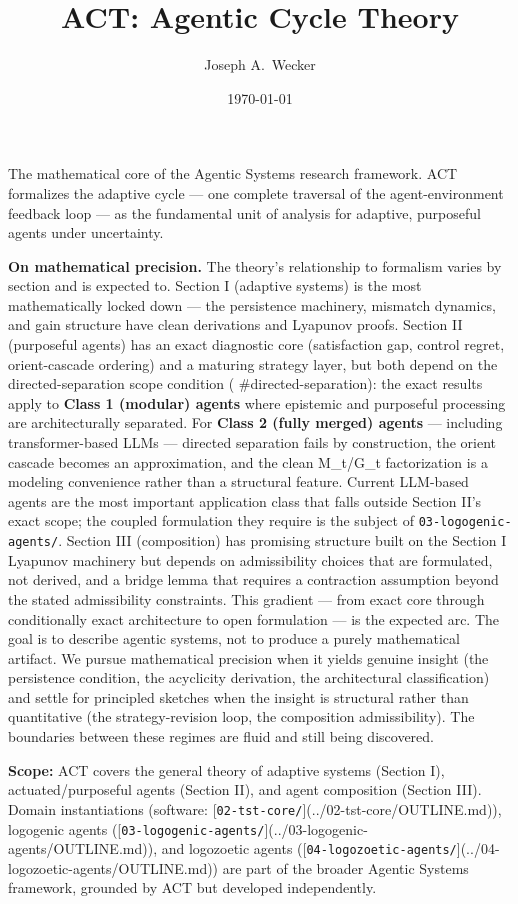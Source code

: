 \documentclass[11pt,oneside]{article}
\title{ACT: Agentic Cycle Theory}
\author{Joseph A.\ Wecker}
\date{\today}
\begin{document}
\maketitle
\tableofcontents
\newpage

The mathematical core of the Agentic Systems research framework. ACT formalizes the adaptive cycle — one complete traversal of the agent-environment feedback loop — as the fundamental unit of analysis for adaptive, purposeful agents under uncertainty.

\textbf{On mathematical precision.} The theory's relationship to formalism varies by section and is expected to. Section I (adaptive systems) is the most mathematically locked down — the persistence machinery, mismatch dynamics, and gain structure have clean derivations and Lyapunov proofs. Section II (purposeful agents) has an exact diagnostic core (satisfaction gap, control regret, orient-cascade ordering) and a maturing strategy layer, but both depend on the directed-separation scope condition ( \#directed-separation): the exact results apply to \textbf{Class 1 (modular) agents} where epistemic and purposeful processing are architecturally separated. For \textbf{Class 2 (fully merged) agents} — including transformer-based LLMs — directed separation fails by construction, the orient cascade becomes an approximation, and the clean M\_t/G\_t factorization is a modeling convenience rather than a structural feature. Current LLM-based agents are the most important application class that falls outside Section II's exact scope; the coupled formulation they require is the subject of \texttt{03-logogenic-agents/}. Section III (composition) has promising structure built on the Section I Lyapunov machinery but depends on admissibility choices that are formulated, not derived, and a bridge lemma that requires a contraction assumption beyond the stated admissibility constraints. This gradient — from exact core through conditionally exact architecture to open formulation — is the expected arc. The goal is to describe agentic systems, not to produce a purely mathematical artifact. We pursue mathematical precision when it yields genuine insight (the persistence condition, the acyclicity derivation, the architectural classification) and settle for principled sketches when the insight is structural rather than quantitative (the strategy-revision loop, the composition admissibility). The boundaries between these regimes are fluid and still being discovered.

\textbf{Scope:} ACT covers the general theory of adaptive systems (Section I), actuated/purposeful agents (Section II), and agent composition (Section III). Domain instantiations (software: [\texttt{02-tst-core/}](../02-tst-core/OUTLINE.md)), logogenic agents ([\texttt{03-logogenic-agents/}](../03-logogenic-agents/OUTLINE.md)), and logozoetic agents ([\texttt{04-logozoetic-agents/}](../04-logozoetic-agents/OUTLINE.md)) are part of the broader Agentic Systems framework, grounded by ACT but developed independently.
\end{document}
